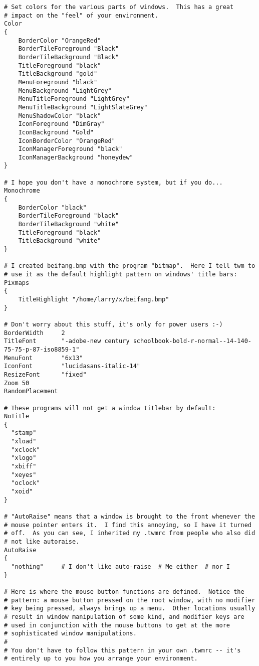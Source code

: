 \begin{screen}
    \begin{verbatim}
# Set colors for the various parts of windows.  This has a great
# impact on the "feel" of your environment.
Color
{
    BorderColor "OrangeRed"
    BorderTileForeground "Black"
    BorderTileBackground "Black"
    TitleForeground "black"
    TitleBackground "gold"
    MenuForeground "black"
    MenuBackground "LightGrey"
    MenuTitleForeground "LightGrey"
    MenuTitleBackground "LightSlateGrey"
    MenuShadowColor "black"
    IconForeground "DimGray"
    IconBackground "Gold"
    IconBorderColor "OrangeRed"
    IconManagerForeground "black"
    IconManagerBackground "honeydew"
}

# I hope you don't have a monochrome system, but if you do...
Monochrome
{
    BorderColor "black"
    BorderTileForeground "black"
    BorderTileBackground "white"
    TitleForeground "black"
    TitleBackground "white"
}

# I created beifang.bmp with the program "bitmap".  Here I tell twm to
# use it as the default highlight pattern on windows' title bars:
Pixmaps
{
    TitleHighlight "/home/larry/x/beifang.bmp"
}

# Don't worry about this stuff, it's only for power users :-)
BorderWidth     2
TitleFont       "-adobe-new century schoolbook-bold-r-normal--14-140-75-75-p-87-iso8859-1"
MenuFont        "6x13"
IconFont        "lucidasans-italic-14"
ResizeFont      "fixed"
Zoom 50
RandomPlacement

# These programs will not get a window titlebar by default:
NoTitle
{
  "stamp"
  "xload"
  "xclock"
  "xlogo"
  "xbiff"
  "xeyes"
  "oclock"
  "xoid"
}

# "AutoRaise" means that a window is brought to the front whenever the
# mouse pointer enters it.  I find this annoying, so I have it turned
# off.  As you can see, I inherited my .twmrc from people who also did
# not like autoraise.
AutoRaise 
{
  "nothing"     # I don't like auto-raise  # Me either  # nor I
}

# Here is where the mouse button functions are defined.  Notice the
# pattern: a mouse button pressed on the root window, with no modifier
# key being pressed, always brings up a menu.  Other locations usually
# result in window manipulation of some kind, and modifier keys are
# used in conjunction with the mouse buttons to get at the more
# sophisticated window manipulations.
#
# You don't have to follow this pattern in your own .twmrc -- it's
# entirely up to you how you arrange your environment.


\end{verbatim}
\end{screen}
